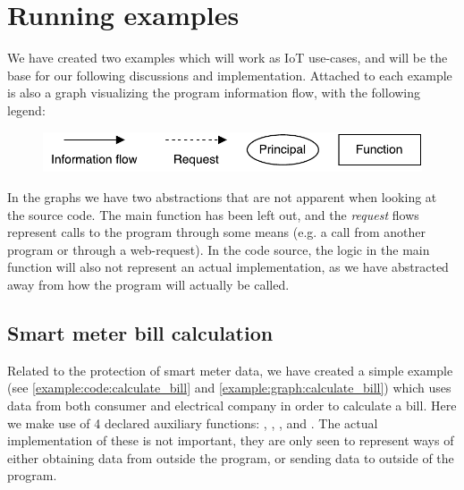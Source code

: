 
\section{Running examples}\label{examples:sec}
We have created two examples which will work as IoT use-cases, and will be the base for our following discussions and implementation.
Attached to each example is also a graph visualizing the program information flow, with the following legend:
\begin{figure}[H]
  \centering
  \includegraphics[scale=0.8]{figures/dlm_legend}
\end{figure}
In the graphs we have two abstractions that are not apparent when looking at the source code.
The main function has been left out, and the \emph{request} flows represent calls to the program through some means (e.g. a call from another program or through a web-request).
In the code source, the logic in the main function will also not represent an actual implementation, as we have abstracted away from how the program will actually be called.

\subsection{Smart meter bill calculation}
Related to the protection of smart meter data, we have created a simple example (see \cref{example:code:calculate_bill} and \cref{example:graph:calculate_bill}) which uses data from both consumer and electrical company in order to calculate a bill.
Here we make use of 4 declared auxiliary functions: , , , and .
The actual implementation of these is not important, they are only seen to represent ways of either obtaining data from outside the program, or sending data to outside of the program.

